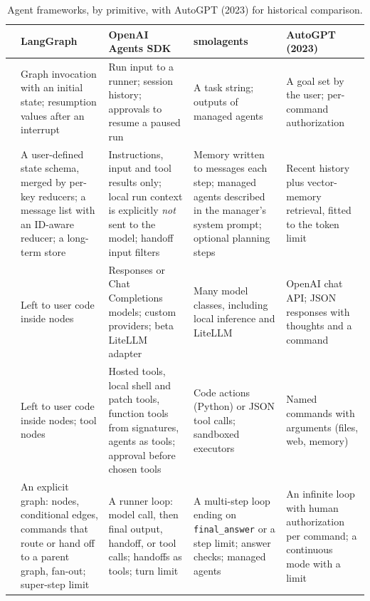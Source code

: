 \begin{table}[p]
\centering
\scriptsize
\setlength{\tabcolsep}{3pt}
\renewcommand{\arraystretch}{1.15}
\caption{Agent frameworks, by primitive, with AutoGPT (2023) for historical comparison.}
\label{tab:frameworks}
\begin{tabularx}{\linewidth}{@{}>{\bfseries}p{1.95cm}YYYY@{}}
\toprule
& LangGraph & OpenAI Agents SDK & smolagents & AutoGPT (2023) \\
\midrule
{} &
Graph invocation with an initial state; resumption values after an interrupt &
Run input to a runner; session history; approvals to resume a paused run &
A task string; outputs of managed agents &
A goal set by the user; per-command authorization \\
\addlinespace
{} &
A user-defined state schema, merged by per-key reducers; a message list with an ID-aware reducer; a long-term store &
Instructions, input and tool results only; local run context is explicitly \emph{not} sent to the model; handoff input filters &
Memory written to messages each step; managed agents described in the manager's system prompt; optional planning steps &
Recent history plus vector-memory retrieval, fitted to the token limit \\
\addlinespace
{}\newline{} &
Left to user code inside nodes &
Responses or Chat Completions models; custom providers; beta LiteLLM adapter &
Many model classes, including local inference and LiteLLM &
OpenAI chat API; JSON responses with thoughts and a command \\
\addlinespace
{} &
Left to user code inside nodes; tool nodes &
Hosted tools, local shell and patch tools, function tools from signatures, agents as tools; approval before chosen tools &
Code actions (Python) or JSON tool calls; sandboxed executors &
Named commands with arguments (files, web, memory) \\
\addlinespace
{} &
An explicit graph: nodes, conditional edges, commands that route or hand off to a parent graph, fan-out; super-step limit &
A runner loop: model call, then final output, handoff, or tool calls; handoffs as tools; turn limit &
A multi-step loop ending on \texttt{final\_answer} or a step limit; answer checks; managed agents &
An infinite loop with human authorization per command; a continuous mode with a limit \\
\bottomrule
\end{tabularx}
\end{table}


